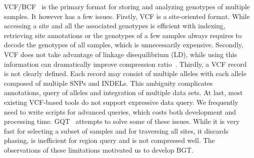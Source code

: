 \documentclass{bioinfo}
\begin{document}
VCF/BCF~\citep{Danecek:2011qy} is the primary format for storing and analyzing
genotypes of multiple samples.  It however has a few issues. Firstly, VCF
is a site-oriented format. While accessing a site and all the associated
genotypes is efficient with indexing, retrieving
site annotations or the genotypes of a few samples always requires to decode
the genotypes of all samples, which is unnecessarily expensive. Secondly, VCF
does not take advantage of linkage disequilibrium (LD), while using this
information can dramatically improve compression ratio~\citep{Durbin:2014yq}.
Thirdly, a VCF record is not clearly defined. Each record may consist of
multiple alleles with each allele composed of multiple SNPs and INDELs. This
ambiguity complicates annotations, query of alleles and integration of multiple
data sets. At last, most existing VCF-based tools do not support expressive
data query. We frequently need to write scripts for advanced queries, which
costs both development and processing time. GQT~\citep{Ruan:2015ab} attempts
to solve some of these issues. While it is very fast for selecting a subset of
samples and for traversing all sites, it discards phasing, is inefficient for
region query and is not compressed well. The observations of these limitations
motivated us to develop BGT.
\end{document}
